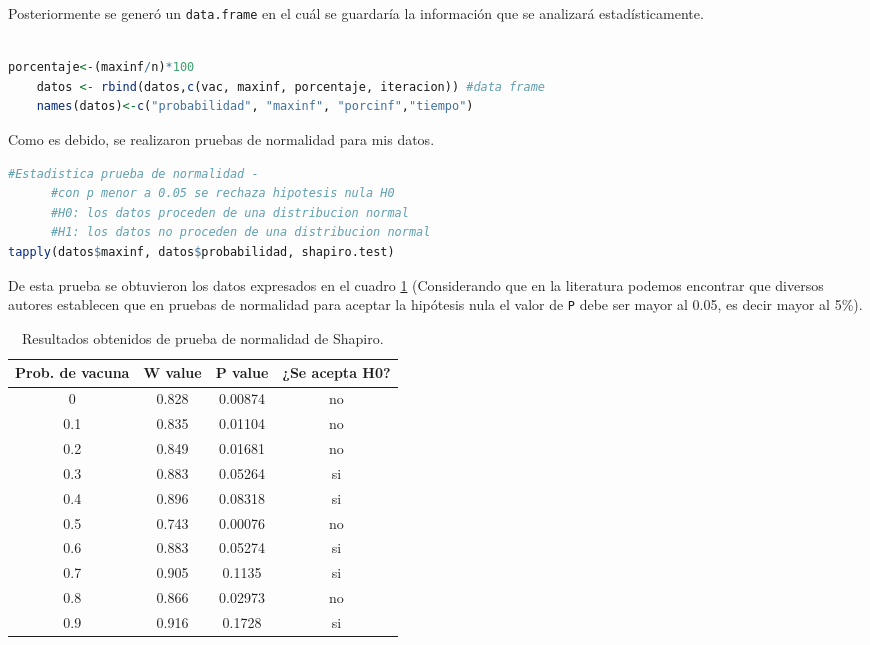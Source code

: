 \documentclass{article}
\begin{document}
Posteriormente se gener\'o un \texttt{data.frame} en el cu\'al se guardar\'ia la información que se analizar\'a estad\'isticamente.
\begin{lstlisting}[language=R, caption= Segmento de c\'odigo para generar data frame.]

porcentaje<-(maxinf/n)*100
    datos <- rbind(datos,c(vac, maxinf, porcentaje, iteracion)) #data frame 
    names(datos)<-c("probabilidad", "maxinf", "porcinf","tiempo")
\end{lstlisting}


Como es debido, se realizaron pruebas de normalidad para mis datos.



\bigskip
\bigskip


\begin{lstlisting}[language=R, caption= Segmento de c\'odigo para prueba de normalidad Shapiro-Wilk.]
#Estadistica prueba de normalidad - 
      #con p menor a 0.05 se rechaza hipotesis nula H0
      #H0: los datos proceden de una distribucion normal
      #H1: los datos no proceden de una distribucion normal
tapply(datos$maxinf, datos$probabilidad, shapiro.test)
\end{lstlisting}

De esta prueba se obtuvieron los datos expresados en el cuadro \ref{cuadro 1} (Considerando que en la literatura podemos encontrar que diversos autores establecen que en pruebas de normalidad para aceptar la hip\'otesis nula el valor de \texttt{P} debe ser mayor al 0.05, es decir mayor al 5\%).

\begin{table}[ht]
    \centering
    \caption{Resultados obtenidos de prueba de normalidad de Shapiro.} 
    \begin{tabular}{|c|c|c|c|}
    \hline
    Prob. de vacuna & W value & P value & ¿Se acepta H0?  \\
    \hline
    0 & 0.828 & 0.00874 & no \\
    \hline 
     0.1 & 0.835 & 0.01104 & no  \\
    \hline 
    0.2 & 0.849 & 0.01681 & no \\
    \hline 
    0.3 & 0.883 & 0.05264 & si \\
    \hline 
    0.4 & 0.896 & 0.08318 & si \\
    \hline 
    0.5 & 0.743 & 0.00076 & no \\
    \hline 
    0.6 & 0.883 & 0.05274 & si \\
    \hline 
    0.7 & 0.905 & 0.1135 & si \\
    \hline 
    0.8 & 0.866 & 0.02973 & no \\
    \hline 
    0.9 & 0.916 & 0.1728 & si \\
    \hline 
\end{tabular}
    \label{cuadro 1}
\end{table}
\end{document}
